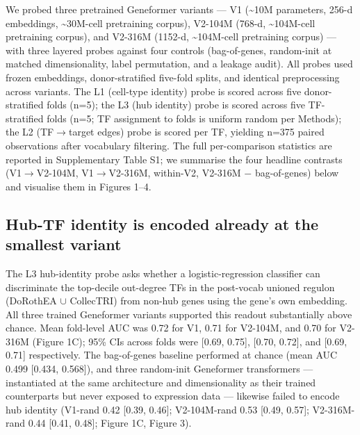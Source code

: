 \documentclass[10pt]{article}
\begin{document}
We probed three pretrained Geneformer variants --- V1
(\textasciitilde10M parameters, 256-d embeddings,
\textasciitilde30M-cell pretraining corpus), V2-104M (768-d,
\textasciitilde104M-cell pretraining corpus), and V2-316M (1152-d,
\textasciitilde104M-cell pretraining corpus) --- with three layered
probes against four controls (bag-of-genes, random-init at matched
dimensionality, label permutation, and a leakage audit). All probes used
frozen embeddings, donor-stratified five-fold splits, and identical
preprocessing across variants. The L1 (cell-type identity) probe is
scored across five donor-stratified folds (n=5); the L3 (hub identity)
probe is scored across five TF-stratified folds (n=5; TF assignment to
folds is uniform random per Methods); the L2 (TF$\to$target edges) probe is
scored per TF, yielding n=375 paired observations after vocabulary
filtering. The full per-comparison statistics are reported in
Supplementary Table S1; we summarise the four headline contrasts
(V1$\to$V2-104M, V1$\to$V2-316M, within-V2, V2-316M $-$ bag-of-genes) below and
visualise them in Figures 1--4.

\subsection{Hub-TF identity is encoded already at the smallest
variant}\label{hub-tf-identity-is-encoded-already-at-the-smallest-variant}

The L3 hub-identity probe asks whether a logistic-regression classifier
can discriminate the top-decile out-degree TFs in the post-vocab
unioned regulon (DoRothEA $\cup$ CollecTRI) from non-hub genes using the gene's own embedding. All
three trained Geneformer variants supported this readout substantially
above chance. Mean fold-level AUC was 0.72 for V1, 0.71 for V2-104M, and
0.70 for V2-316M (Figure 1C); 95\% CIs across folds were {[}0.69,
0.75{]}, {[}0.70, 0.72{]}, and {[}0.69, 0.71{]} respectively. The
bag-of-genes baseline performed at chance (mean AUC 0.499 {[}0.434,
0.568{]}), and three random-init Geneformer transformers ---
instantiated at the same architecture and dimensionality as their
trained counterparts but never exposed to expression data --- likewise
failed to encode hub identity (V1-rand 0.42 {[}0.39, 0.46{]};
V2-104M-rand 0.53 {[}0.49, 0.57{]}; V2-316M-rand 0.44 {[}0.41, 0.48{]};
Figure 1C, Figure 3).
\end{document}
